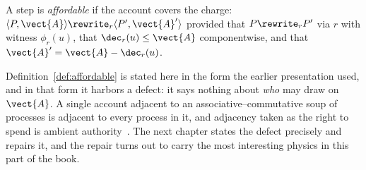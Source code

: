 \begin{definition}
\label{def:affordable}
A step is \emph{affordable} if the account covers the charge:
$\langle P, \vect{A}\rangle \rewrite_r \langle P', \vect{A}'\rangle$
provided that $P \rewrite_r P'$ via $r$ with witness $\phi_r(u)$, that
$\dec_r(u) \leq \vect{A}$ componentwise, and that
$\vect{A}' = \vect{A} - \dec_r(u)$.
\end{definition}

Definition~\ref{def:affordable} is stated here in the form the earlier
presentation used, and in that form it harbors a defect: it says nothing
about \emph{who} may draw on $\vect{A}$.  A single account adjacent to an
associative--commutative soup of processes is adjacent to every process in
it, and adjacency taken as the right to spend is ambient
authority~\cite{finrho}.  The next chapter states the defect precisely and
repairs it, and the repair turns out to carry the most interesting physics
in this part of the book.

